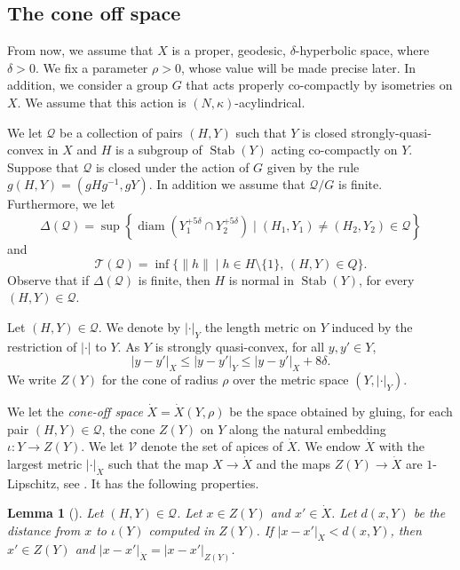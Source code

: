\documentclass[JEP,XML,SOM,Unicode, NoEqCountersInSection,published]{cedram}
\let\mathcal\mathscr
\theoremstyle{plain}
\newtheorem{lem}[thm]{Lemma}
\theoremstyle{definition}
\DeclareMathOperator{\diam}{diam}
\newcommand{\cX}{\dot{X}}
\newcommand{\stab}[1]{\operatorname{Stab}(#1)}
\begin{document}
\subsection{The cone off space}
From now, we assume that $X$ is a proper, geodesic, $\delta$\nobreakdash-hyperbolic space, where $\delta >0$.
We fix a parameter $\rho > 0$, whose value will be made precise later.
In addition, we consider a group $G$ that acts properly co-compactly by isometries on $X$.
We assume that this action is $(N,\kappa)$-acylindrical.

We let $\mathcal Q$ be a collection of pairs $(H, Y) $ such that $Y$ is closed strongly-quasi-convex
in $X$ and $H$ is a subgroup of $\stab Y$ acting co-compactly on $Y$.
Suppose that $\mathcal Q$ is closed under the action of $G$ given by the rule $g(H,Y)=(gHg^{-1}, gY)$.
In addition we assume that $\mathcal Q/G$ is finite.
Furthermore, we let
\begin{equation*}
\Delta(\mathcal Q) = \sup \left\{ \diam \left( Y_1^{+5\delta} \cap Y_2^{+5\delta} \right) \mid (H_1, Y_1) \neq (H_2,Y_2) \in \mathcal Q\right\}
\end{equation*}
and
\begin{equation*}
\mathcal{T}(\mathcal Q)=\inf \{\| h \|\mid h\in H \setminus \{1\},\, (H,Y) \in Q\}.
\end{equation*}
Observe that if $\Delta(\mathcal Q)$ is finite, then $H$ is normal in $\stab Y$, for every $(H,Y) \in \mathcal Q$.

Let $(H,Y) \in \mathcal Q$. We denote by $|\cdot|_Y$ the length metric on $Y$ induced by the restriction of $|\cdot|$ to $Y$.
As $Y$ is strongly quasi-convex, for all $y,y' \in Y$,
\[
|y-y'|_X\leqslant |y-y'|_Y\leqslant |y-y'|_X+ 8\delta.
\]
We write $Z(Y)$ for the cone of radius $\rho$ over the metric space $(Y, |\cdot|_Y)$.

We let the \emph{cone-off space} $\cX= \cX (Y,\rho)$ be the space obtained by gluing, for each pair $(H,Y)\in \mathcal Q$, the cone $Z(Y)$ on $Y$ along the natural embedding $\iota: Y \to Z(Y)$.
We let $\mathcal V$ denote the set of apices of $\cX$.
We endow $\cX$ with the largest metric $|\cdot|_{\cX}$ such that the map $X\to \cX$ and the maps $Z(Y)\to \cX$ are $1$-Lipschitz, see \cite[\S 5.1]{coulon_geometry_2014}. It has the following properties.

\begin{lem}[{\cite[Lem.\,5.7]{coulon_geometry_2014}}]\label{L: metric cone off 2}
Let $(H,Y) \in \mathcal Q$.
Let $x \in Z(Y)$ and $x' \in \cX$.
Let $d(x,Y)$ be the distance from $x$ to $\iota(Y)$ computed in $Z(Y)$.
If $|x-x'|_{\cX} < d(x, Y)$, then $x' \in Z(Y)$ and $|x-x'|_{\cX} = |x-x'|_{Z(Y)}$.
\end{lem}
\end{document}
